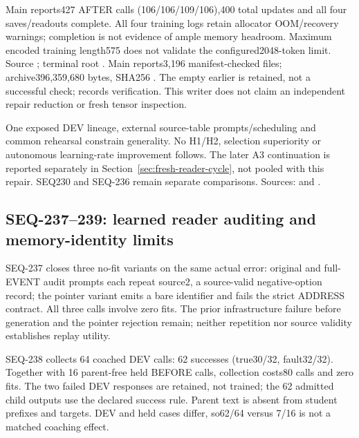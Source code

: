 \documentclass{article}
\begin{document}
Main reports427 AFTER calls (106/106/109/106),400 total updates and all four
saves/readouts complete. All four training logs retain allocator OOM/recovery
warnings; completion is not evidence of ample memory headroom. Maximum encoded
training length575 does not validate the configured2048-token limit.
Source ; terminal root
.
Main reports3,196 manifest-checked files; archive396,359,680 bytes, SHA256
.
The empty earlier  is retained, not a successful check;
 records verification. This writer does not claim an
independent repair reduction or fresh tensor inspection.

One exposed DEV lineage, external source-table prompts/scheduling and common
rehearsal constrain generality. No H1/H2, selection superiority or autonomous
learning-rate improvement follows. The later A3 continuation is reported
separately in Section~\ref{sec:fresh-reader-cycle}, not pooled with this repair.
SEQ230 and SEQ-236 remain separate comparisons. Sources:
 and
.

\subsection{SEQ-237--239: learned reader auditing and memory-identity limits}
\label{sec:reader-audit-lesson}

SEQ-237 closes three no-fit variants on the same actual error: original and
full-EVENT audit prompts each repeat source2, a source-valid negative-option
record; the pointer variant emits a bare identifier and fails the strict
ADDRESS contract. All three calls involve zero fits. The prior infrastructure
failure before generation and the pointer rejection remain; neither repetition
nor source validity establishes replay utility.

SEQ-238 collects 64 coached DEV calls: 62 successes (true30/32, fault32/32).
Together with 16 parent-free held BEFORE calls, collection costs80 calls and
zero fits. The two failed DEV responses are retained, not trained; the
62 admitted child outputs use the declared success rule. Parent text is absent
from student prefixes and targets. DEV and held cases differ, so62/64 versus
7/16 is not a matched coaching effect.
\end{document}
